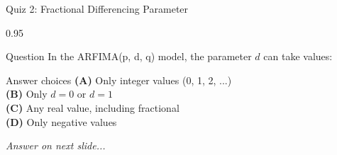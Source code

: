 \documentclass[9pt, aspectratio=169, t]{beamer}
\begin{document}
\begin{frame}{Quiz 2: Fractional Differencing Parameter}
    \begin{cminipage}{0.95\textwidth}
    \begin{alertblock}{Question}
        In the ARFIMA(p, d, q) model, the parameter $d$ can take values:
    \end{alertblock}

    \vspace{0.4cm}

    \begin{block}{Answer choices}
        \textcolor{MainBlue}{\textbf{(A)}} Only integer values (0, 1, 2, ...)\\[3pt]
        \textcolor{MainBlue}{\textbf{(B)}} Only $d = 0$ or $d = 1$\\[3pt]
        \textcolor{MainBlue}{\textbf{(C)}} Any real value, including fractional\\[3pt]
        \textcolor{MainBlue}{\textbf{(D)}} Only negative values
    \end{block}

    \vspace{0.5cm}

    \begin{center}
        \textit{Answer on next slide...}
    \end{center}
    \end{cminipage}
\end{frame}
\end{document}
